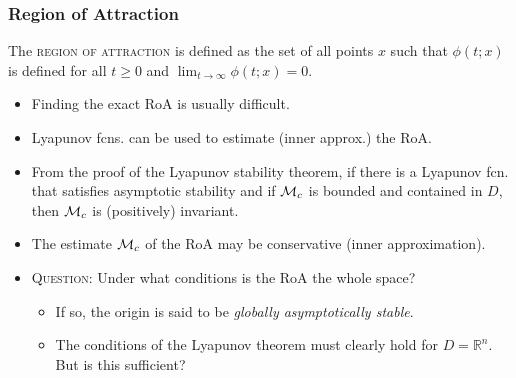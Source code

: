 \begin{frame}
    \frametitle{Region of Attraction}

    \begin{definition}
        The \textsc{region of attraction} is defined as the set of all points
        $x$ such that $\phi(t; x)$ is defined for all $t \geq 0$ and $\lim_{t
        \to \infty} \phi(t; x) = 0$.
    \end{definition}
    \begin{itemize}
        \item Finding the exact RoA is usually difficult.
        \item Lyapunov fcns. can be used to estimate (inner approx.) the RoA.
        \item From the proof of the Lyapunov stability theorem, if there is a
        Lyapunov fcn. that satisfies asymptotic stability and if $\mathcal{M}_c$ is
        bounded and contained in $D$, then $\mathcal{M}_c$ is (positively) invariant.
        \item The estimate $\mathcal{M}_c$ of the RoA may be conservative (inner
        approximation).
        \item \textsc{Question}: Under what conditions is the RoA the whole space?
        \begin{itemize}
            \item If so, the origin is said to be \textit{globally asymptotically stable}.
            \item The conditions of the Lyapunov theorem must clearly hold for
            $D = \mathbb{R}^n$. But is this sufficient?
        \end{itemize}
    \end{itemize}
\end{frame}


